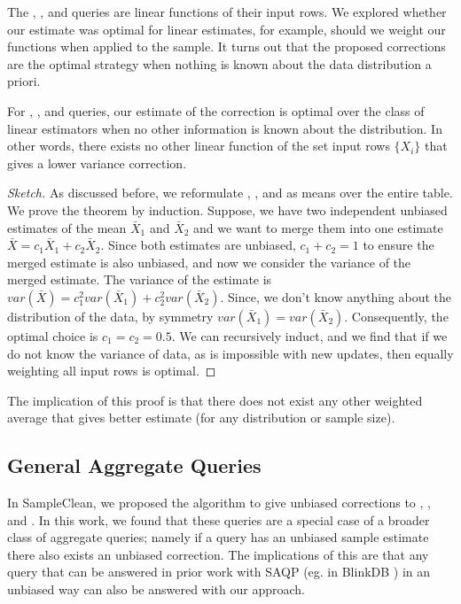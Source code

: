 The \sumfunc, \countfunc, and \avgfunc queries are linear functions of their input rows.
We explored whether our estimate was optimal for linear estimates, for example, should we weight our functions when applied to the sample.
It turns out that the proposed corrections are the optimal strategy when nothing is known about the data distribution a priori.

\begin{theorem}
For \sumfunc, \countfunc, and \avgfunc queries, our estimate of the correction is optimal over the class of linear estimators when no other information is known about the distribution. 
In other words, there exists no other linear function of the set input rows $\{ X_i \}$ that gives a lower variance correction.
\end{theorem}
\begin{proof}[Sketch]
As discussed before, we reformulate \sumfunc, \countfunc, and \avgfunc as means over the entire table. We prove the theorem by induction. 
Suppose, we have two independent unbiased estimates of the mean $\bar{X}_1$ and $\bar{X}_2$ and we want to merge them into one estimate $\bar{X} = c_1\bar{X}_1+c_2\bar{X}_2$.
Since both estimates are unbiased, $c_1 + c_2 = 1$ to ensure the merged estimate is also unbiased, and now we consider the variance of the merged estimate.
The variance of the estimate is $var(\bar{X}) = c_1^2var(\bar{X}_1) + c_2^2var(\bar{X}_2)$.
Since, we don't know anything about the distribution of the data, by symmetry $var(\bar{X}_1) = var(\bar{X}_2)$.
Consequently, the optimal choice is $c_1=c_2=0.5$. 
We can recursively induct, and we find that if we do not know the variance of data, as is impossible with new updates, then equally weighting all input rows is optimal. 
\end{proof}
The implication of this proof is that there does not exist any other weighted average that gives better estimate (for any distribution or sample size).

\subsection{General Aggregate Queries}
In SampleClean, we proposed the \nsc algorithm to give unbiased corrections to \sumfunc, \countfunc, and \avgfunc.
In this work, we found that these queries are a special case of a broader class of aggregate queries; namely if a query has an unbiased sample estimate there also exists an unbiased correction.
The implications of this are that any query that can be answered in prior work with SAQP (eg. in BlinkDB \cite{AgarwalMPMMS13}) in an unbiased way can also be answered with our approach.

